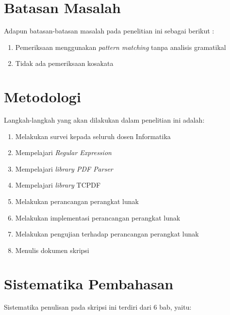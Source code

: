 \section{Batasan Masalah}
\label{sec:batasan}
Adapun batasan-batasan masalah pada penelitian ini sebagai berikut :
\begin{enumerate}
	\item Pemeriksaan menggunakan \textit{pattern matching} tanpa analisis gramatikal
	\item Tidak ada pemeriksaan kosakata
\end{enumerate}

\section{Metodologi}
\label{sec:metlit}
Langkah-langkah yang akan dilakukan dalam penelitian ini adalah:
\begin{enumerate}
	\item Melakukan survei kepada seluruh dosen Informatika
	\item Mempelajari \textit{Regular Expression}	
	\item Mempelajari \textit{library PDF Parser}
	\item Mempelajari \textit{library} TCPDF
	\item Melakukan perancangan perangkat lunak
	\item Melakukan implementasi perancangan perangkat lunak
	\item Melakukan pengujian terhadap perancangan perangkat lunak
	\item Menulis dokumen skripsi
\end{enumerate}

\section{Sistematika Pembahasan}
\label{sec:sispem}
Sistematika penulisan pada skripsi ini terdiri dari 6 bab, yaitu:

